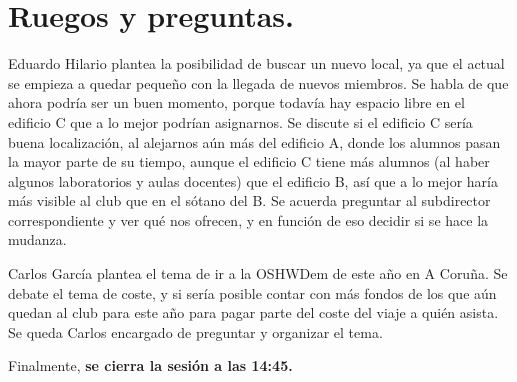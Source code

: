 \documentclass[a4paper]{article}
\begin{document}
\section{Ruegos y preguntas.}

Eduardo Hilario plantea la posibilidad de buscar un nuevo local, ya que el actual se empieza a quedar pequeño con la llegada de nuevos miembros. Se habla de que ahora podría ser un buen momento, porque todavía hay espacio libre en el edificio C que a lo mejor podrían asignarnos. Se discute si el edificio C sería buena localización, al alejarnos aún más del edificio A, donde los alumnos pasan la mayor parte de su tiempo, aunque el edificio C tiene más alumnos (al haber algunos laboratorios y aulas docentes) que el edificio B, así que a lo mejor haría más visible al club que en el sótano del B. Se acuerda preguntar al subdirector correspondiente y ver qué nos ofrecen, y en función de eso decidir si se hace la mudanza.

Carlos García plantea el tema de ir a la OSHWDem de este año en A Coruña. Se debate el tema de coste, y si sería posible contar con más fondos de los que aún quedan al club para este año para pagar parte del coste del viaje a quién asista. Se queda Carlos encargado de preguntar y organizar el tema.

Finalmente, \textbf{se cierra la sesión a las 14:45.}
\end{document}
